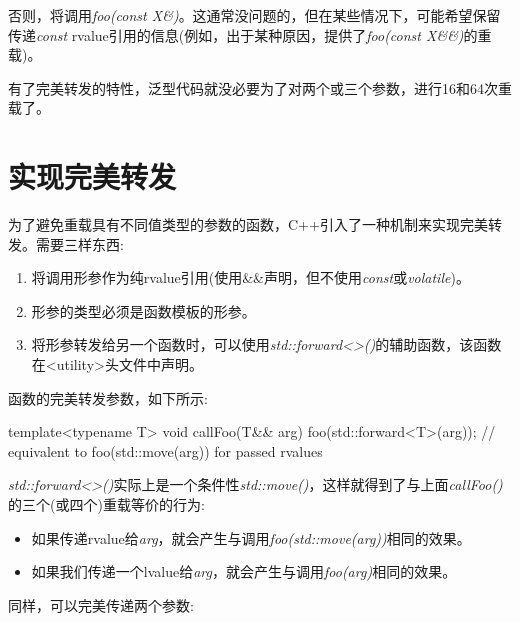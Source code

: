 否则，将调用\textit{foo(\allowbreak{}const X\&)\allowbreak{}}。这通常没问题的，但在某些情况下，可能希望保留传递\textit{const} rvalue引用的信息(例如，出于某种原因，提供了\textit{foo(\allowbreak{}const X\&\&)\allowbreak{}}的重载)。\par

有了完美转发的特性，泛型代码就没必要为了对两个或三个参数，进行16和64次重载了。\par


\section{实现完美转发}

为了避免重载具有不同值类型的参数的函数，C++引入了一种机制来实现完美转发。需要三样东西:\par

\begin{enumerate}
  \item 将调用形参作为纯rvalue引用(使用\&\&声明，但不使用\textit{const}或\textit{volatile})。
  \item 形参的类型必须是函数模板的形参。
  \item 将形参转发给另一个函数时，可以使用\textit{std::\allowbreak{}forward<\allowbreak{}>(\allowbreak{})\allowbreak{}}的辅助函数，该函数在<utility>头文件中声明。
\end{enumerate}

函数的完美转发参数，如下所示:\par

\begin{codebox}[cpp]
template<typename T>
void callFoo(T&& arg) {
  foo(std::forward<T>(arg)); // equivalent to foo(std::move(arg)) for passed rvalues
}
\end{codebox}

\textit{std::\allowbreak{}forward<\allowbreak{}>(\allowbreak{})\allowbreak{}}实际上是一个条件性\textit{std::move()}，这样就得到了与上面\textit{callFoo()}的三个(或四个)重载等价的行为:

\begin{itemize}
  \item 如果传递rvalue给\textit{arg}，就会产生与调用\textit{foo(\allowbreak{}std::\allowbreak{}move(\allowbreak{}arg)\allowbreak{})\allowbreak{}}相同的效果。
  \item 如果我们传递一个lvalue给\textit{arg}，就会产生与调用\textit{foo(arg)}相同的效果。
\end{itemize}

同样，可以完美传递两个参数:\par

